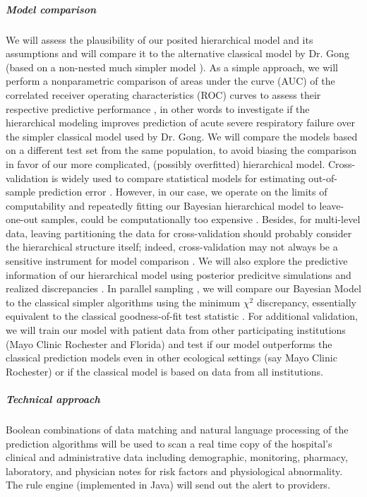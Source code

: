 \documentclass[11pt,notitlepage]{article}
\begin{document}
\subparagraph*{Model comparison}
We will assess the plausibility of our posited hierarchical model and its assumptions \cite{Gelman_predictive_2000,GelmanMengStern1996} and will compare it to the alternative classical model by Dr. Gong (based on a non-nested much simpler model \cite{Herridge_12594312}). As a simple approach, we will perform a nonparametric comparison of areas under the curve (AUC) of the correlated receiver operating characteristics (ROC) curves \cite{DeLong_3203132} to assess their respective predictive performance \cite{Newcombe_22890972,Wu_20473190}, in other words to investigate if the hierarchical modeling improves prediction of acute severe respiratory failure over the simpler classical model used by Dr. Gong. We will compare the models based on a different test set from the same population, to avoid biasing the comparison in favor of our more complicated, (possibly overfitted) hierarchical model. Cross-validation is widely used to compare statistical models for estimating out-of-sample prediction error \cite{Vehtari_12396570}. However, in our case, we operate on the limits of computability and repeatedly fitting our Bayesian hierarchical model to leave-one-out samples, could be computationally too expensive \cite{Gelman_Aki_2014predictive}. Besides, for multi-level data, leaving partitioning the data for cross-validation should probably consider the hierarchical structure itself; indeed, cross-validation may not always be a sensitive instrument for model comparison \cite{wang_predictive_2014}. We will also explore the predictive information of our hierarchical model using posterior predicitve simulations and realized discrepancies \cite{Gelman_Aki_2014predictive,Gelman_predictive_2000,GelmanMengStern1996}. In parallel sampling \cite{Congdon_modelcomparison_2005}, we will compare our Bayesian Model to the classical simpler algorithms using the minimum $\chi^{2}$ discrepancy, essentially equivalent to the classical goodness-of-fit test statistic \cite{GelmanMengStern1996}. For additional validation, we will train our model with patient data from other participating institutions (Mayo Clinic Rochester and Florida) and test if our model outperforms the classical prediction models even in other ecological settings (say Mayo Clinic Rochester) or if the classical model is based on data from all institutions.

\subparagraph*{Technical approach}
Boolean combinations of data matching and natural language processing of the prediction algorithms will be used to scan a real time copy of the hospital's clinical and administrative data including demographic, monitoring, pharmacy, laboratory, and physician notes for risk factors and physiological abnormality. The rule engine (implemented in Java) will send out the alert to providers.
\end{document}
